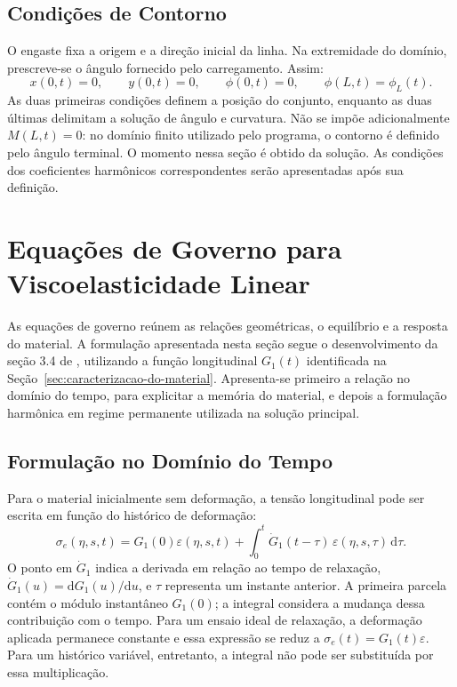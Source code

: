 \documentclass[arial,centeredequations,english,brazilian,oneside,section=TITLE]{ifes8}
\begin{document}
\subsection{Condições de Contorno}
\label{sec:condicoes-contorno}

O engaste fixa a origem e a direção inicial da linha. Na extremidade do domínio,
prescreve-se o ângulo fornecido pelo carregamento. Assim:
\begin{equation}
  x(0,t)=0,\qquad y(0,t)=0,\qquad
  \phi(0,t)=0,\qquad \phi(L,t)=\phi_L(t).
  \label{eq:contorno-geometrico-metodologia}
\end{equation}
As duas primeiras condições definem a posição do conjunto, enquanto as duas
últimas delimitam a solução de ângulo e curvatura. Não se impõe adicionalmente
$M(L,t)=0$: no domínio finito utilizado pelo programa, o contorno é definido
pelo ângulo terminal. O momento nessa seção é obtido da solução. As condições
dos coeficientes harmônicos correspondentes serão apresentadas após sua definição.

\section{Equações de Governo para Viscoelasticidade Linear}
\label{sec:implementando-viscoelasticidade}

As equações de governo reúnem as relações geométricas, o equilíbrio e a resposta
do material. A formulação apresentada nesta seção segue o desenvolvimento da
seção 3.4 de , utilizando a função longitudinal $G_1(t)$
identificada na Seção~\ref{sec:caracterizacao-do-material}. Apresenta-se primeiro
a relação no domínio do tempo, para explicitar a memória do material, e depois
a formulação harmônica em regime permanente utilizada na solução principal.

\subsection{Formulação no Domínio do Tempo}
\label{sec:governo-linear-tempo}

Para o material inicialmente sem deformação, a tensão longitudinal pode ser
escrita em função do histórico de deformação:
\begin{equation}
  \sigma_e(\eta,s,t)=G_1(0)\varepsilon(\eta,s,t)
  +\int_0^t \dot G_1(t-\tau)\,
    \varepsilon(\eta,s,\tau)\,\mathrm{d}\tau.
  \label{eq:constitutiva-linear-historico}
\end{equation}
O ponto em $\dot G_1$ indica a derivada em relação ao tempo de relaxação,
$\dot G_1(u)=\mathrm{d}G_1(u)/\mathrm{d}u$, e $\tau$ representa um instante
anterior. A primeira parcela contém o módulo instantâneo $G_1(0)$; a integral
considera a mudança dessa contribuição com o tempo. Para um ensaio ideal de
relaxação, a deformação aplicada permanece constante e essa expressão se reduz
a $\sigma_e(t)=G_1(t)\varepsilon$. Para um histórico variável, entretanto, a
integral não pode ser substituída por essa multiplicação.
\end{document}

